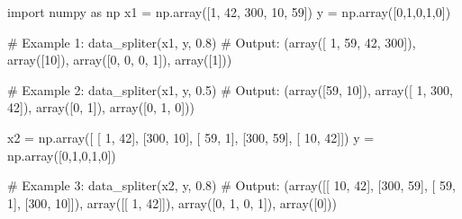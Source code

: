 \documentclass[]{article}
\newenvironment{Shaded}{\begin{snugshade}}{\end{snugshade}}
\newcommand{\CommentTok}[1]{\textcolor[rgb]{0.48,0.49,0.49}{#1}}
\newcommand{\DecValTok}[1]{\textcolor[rgb]{0.96,0.45,0.00}{#1}}
\newcommand{\FloatTok}[1]{\textcolor[rgb]{0.96,0.45,0.00}{#1}}
\newcommand{\ImportTok}[1]{\textcolor[rgb]{0.15,0.68,0.38}{#1}}
\newcommand{\NormalTok}[1]{\textcolor[rgb]{0.81,0.81,0.76}{#1}}
\newcommand{\OperatorTok}[1]{\textcolor[rgb]{0.81,0.81,0.76}{#1}}
\begin{document}
\begin{Shaded}
\begin{Highlighting}[]
\ImportTok{import}\NormalTok{ numpy }\ImportTok{as}\NormalTok{ np}
\NormalTok{x1 }\OperatorTok{=}\NormalTok{ np.array([}\DecValTok{1}\NormalTok{, }\DecValTok{42}\NormalTok{, }\DecValTok{300}\NormalTok{, }\DecValTok{10}\NormalTok{, }\DecValTok{59}\NormalTok{])}
\NormalTok{y }\OperatorTok{=}\NormalTok{ np.array([}\DecValTok{0}\NormalTok{,}\DecValTok{1}\NormalTok{,}\DecValTok{0}\NormalTok{,}\DecValTok{1}\NormalTok{,}\DecValTok{0}\NormalTok{])}

\CommentTok{# Example 1:}
\NormalTok{data_spliter(x1, y, }\FloatTok{0.8}\NormalTok{)}
\CommentTok{# Output:}
\NormalTok{(array([  }\DecValTok{1}\NormalTok{,  }\DecValTok{59}\NormalTok{,  }\DecValTok{42}\NormalTok{, }\DecValTok{300}\NormalTok{]), array([}\DecValTok{10}\NormalTok{]), array([}\DecValTok{0}\NormalTok{, }\DecValTok{0}\NormalTok{, }\DecValTok{0}\NormalTok{, }\DecValTok{1}\NormalTok{]), array([}\DecValTok{1}\NormalTok{]))}

\CommentTok{# Example 2:}
\NormalTok{data_spliter(x1, y, }\FloatTok{0.5}\NormalTok{)}
\CommentTok{# Output:}
\NormalTok{(array([}\DecValTok{59}\NormalTok{, }\DecValTok{10}\NormalTok{]), array([  }\DecValTok{1}\NormalTok{, }\DecValTok{300}\NormalTok{,  }\DecValTok{42}\NormalTok{]), array([}\DecValTok{0}\NormalTok{, }\DecValTok{1}\NormalTok{]), array([}\DecValTok{0}\NormalTok{, }\DecValTok{1}\NormalTok{, }\DecValTok{0}\NormalTok{]))}

\NormalTok{x2 }\OperatorTok{=}\NormalTok{ np.array([ [  }\DecValTok{1}\NormalTok{,  }\DecValTok{42}\NormalTok{],}
\NormalTok{                [}\DecValTok{300}\NormalTok{,  }\DecValTok{10}\NormalTok{],}
\NormalTok{                [ }\DecValTok{59}\NormalTok{,   }\DecValTok{1}\NormalTok{],}
\NormalTok{                [}\DecValTok{300}\NormalTok{,  }\DecValTok{59}\NormalTok{],}
\NormalTok{                [ }\DecValTok{10}\NormalTok{,  }\DecValTok{42}\NormalTok{]])}
\NormalTok{y }\OperatorTok{=}\NormalTok{ np.array([}\DecValTok{0}\NormalTok{,}\DecValTok{1}\NormalTok{,}\DecValTok{0}\NormalTok{,}\DecValTok{1}\NormalTok{,}\DecValTok{0}\NormalTok{])}

\CommentTok{# Example 3:}
\NormalTok{data_spliter(x2, y, }\FloatTok{0.8}\NormalTok{)}
\CommentTok{# Output:}
\NormalTok{(array([[ }\DecValTok{10}\NormalTok{,  }\DecValTok{42}\NormalTok{],}
\NormalTok{        [}\DecValTok{300}\NormalTok{,  }\DecValTok{59}\NormalTok{],}
\NormalTok{        [ }\DecValTok{59}\NormalTok{,   }\DecValTok{1}\NormalTok{],}
\NormalTok{        [}\DecValTok{300}\NormalTok{,  }\DecValTok{10}\NormalTok{]]), array([[ }\DecValTok{1}\NormalTok{, }\DecValTok{42}\NormalTok{]]), array([}\DecValTok{0}\NormalTok{, }\DecValTok{1}\NormalTok{, }\DecValTok{0}\NormalTok{, }\DecValTok{1}\NormalTok{]), array([}\DecValTok{0}\NormalTok{]))}


\end{Highlighting}
\end{Shaded}
\end{document}

